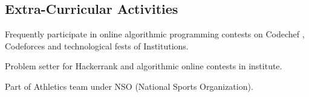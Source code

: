 \documentclass[hidelinks,margin,line,10pt,a4paper]{resume}
\begin{document}
\begin{resume}
    \section{\mysidestyle Extra-Curricular Activities} 
\begin{list2}
\item Frequently participate in online algorithmic programming contests on Codechef , Codeforces and technological fests of Institutions.\vspace{1mm}%
\item Problem setter for Hackerrank and algorithmic online contests in institute. \vspace{1mm}%
\item Part of Athletics team under NSO (National Sports Organization). \vspace{1mm}%
\end{list2}


\end{resume}
\end{document}
